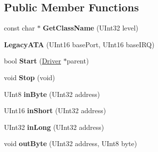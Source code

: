 \subsection*{Public Member Functions}
\begin{DoxyCompactItemize}
\item 
\mbox{\label{class_standard_p_c___internal_1_1_legacy_a_t_a_a58a1064f5e621f4ed393f25721859021}} 
const char $\ast$ {\bfseries Get\+Class\+Name} (U\+Int32 level)
\item 
\mbox{\label{class_standard_p_c___internal_1_1_legacy_a_t_a_a980a607bc3e3ea4cb97cdc46d860fa13}} 
{\bfseries Legacy\+A\+TA} (U\+Int16 base\+Port, U\+Int16 base\+I\+RQ)
\item 
\mbox{\label{class_standard_p_c___internal_1_1_legacy_a_t_a_a4077aba1a8803a5375bacdf2dbfa04ae}} 
bool {\bfseries Start} (\hyperlink{class_driver}{Driver} $\ast$parent)
\item 
\mbox{\label{class_standard_p_c___internal_1_1_legacy_a_t_a_aef130f5c8123b642751f7f4cf3207acf}} 
void {\bfseries Stop} (void)
\item 
\mbox{\label{class_standard_p_c___internal_1_1_legacy_a_t_a_afb804bc153543f6526617ca0b244e8ae}} 
U\+Int8 {\bfseries in\+Byte} (U\+Int32 address)
\item 
\mbox{\label{class_standard_p_c___internal_1_1_legacy_a_t_a_a9872e9721d34270aea57a7ca50a30bb5}} 
U\+Int16 {\bfseries in\+Short} (U\+Int32 address)
\item 
\mbox{\label{class_standard_p_c___internal_1_1_legacy_a_t_a_aed9fb6dc21332eaec46aacb018ed76ce}} 
U\+Int32 {\bfseries in\+Long} (U\+Int32 address)
\item 
\mbox{\label{class_standard_p_c___internal_1_1_legacy_a_t_a_a0e61b4736f639181a489d248601ada2f}} 
void {\bfseries out\+Byte} (U\+Int32 address, U\+Int8 byte)

\end{DoxyCompactItemize}
